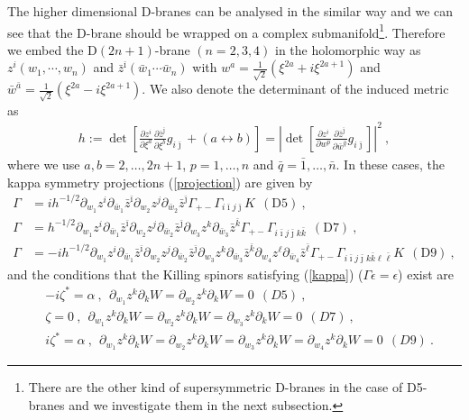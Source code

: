 \documentclass[a4paper,12pt]{article}
\numberwithin{equation}{section}
\newcommand{\del}{\partial}
\newcommand{\ib}{\bar{\imath}}
\newcommand{\jb}{\bar{\jmath}}
\newcommand{\kb}{\bar{k}}
\newcommand{\lb}{\bar{\ell}}
\newcommand{\wb}{\bar{w}}
\newcommand{\zb}{\bar{z}}
\newcommand{\nn}{\nonumber\\}
\newcommand{\deldel}[2]{\frac{\del #1}{\del #2}}
\begin{document}
The higher dimensional D-branes can be  analysed in the similar way and
we can see that the D-brane should be wrapped
on a complex submanifold\footnote{There are the other kind of
supersymmetric D-branes in the case of D5-branes and 
we investigate them in the next subsection.}.
Therefore we embed the D$(2n+1)$-brane $(n=2,3,4)$ 
in the holomorphic way as $z^i(w_1, \cdots, w_n)$ and 
$\bar{z}^{\ib} (\bar{w}_1 \cdots \bar{w}_n)$ with 
$w^a=\frac{1}{\sqrt{2}}(\xi^{2a} + i  \xi^{2a+1})$  and
$\bar{w}^{\bar{a}}=\frac{1}{\sqrt{2}}(\xi^{2a} - i \xi^{2a+1})$.
We also denote the determinant of the induced metric as
\begin{align}
  h:=\det \left[\deldel{z^{i}}{\xi^{a}} 
        \deldel{\zb^{\jb}}{\xi^{b}} g_{i \jb}+(a\leftrightarrow b)\right]
    =\left|\det\left[\deldel{z^{i}}{w^{p}} 
        \deldel{\zb^{\jb}}{\wb^{\bar{q}}} g_{i \jb}\right]\right|^2~,
\end{align}
where we use 
 $a,b=2,\dots,2n+1$, $p=1,\dots,n$ and  $\bar{q}=\bar{1},\dots,\bar{n}$.
In these cases, the kappa symmetry projections (\ref{projection}) are
given by  
\begin{align}
 \Gamma&= i h^{-1/2}
  {\del_{w_1}z^{i}\del_{\wb_1}\zb^{\ib}
        \del_{w_2}z^{j}\del_{\wb_2}\zb^{\jb}}%
       \Gamma_{+-}\Gamma_{i \ib j \jb} K ~~(\mbox{D5})~,\nn
 \Gamma&=h^{-1/2}
  {\del_{w_1}z^{i}\del_{\wb_1}\zb^{\ib}
        \del_{w_2}z^{j}\del_{\wb_2}\zb^{\jb}
        \del_{w_3}z^{k}\del_{\wb_3}\zb^{\kb}}%
       \Gamma_{+-}\Gamma_{i \ib j \jb k \kb} 
      ~~(\mbox{D7})~,\nn
 \Gamma&= -i h^{-1/2}
  {\del_{w_1}z^{i}\del_{\wb_1}\zb^{\ib}
        \del_{w_2}z^{j}\del_{\wb_2}\zb^{\jb}
        \del_{w_3}z^{k}\del_{\wb_3}\zb^{\kb}
        \del_{w_4}z^{\ell}\del_{\wb_4}\zb^{\lb}}%
       \Gamma_{+-}\Gamma_{i\ib j\jb k\kb \ell\lb}K
     ~~(\mbox{D9})~,
\end{align}
and the conditions that the Killing spinors satisfying (\ref{kappa})
($\Gamma \epsilon = \epsilon$) exist are
\begin{align}
 &- i\zeta^{*}=\alpha~, 
  ~~ \del_{w_1}z^{k}\del_{k} W=\del_{w_2}z^{k}\del_{k} W=0 ~~(D5)~,\nn
 &\zeta=0~, ~~ \del_{w_1}z^{k}\del_{k} W=
            \del_{w_2}z^{k}\del_{k} W=\del_{w_3}z^{k}\del_{k} W=0~~(D7)~,\nn
 & i\zeta^{*}=\alpha~, 
  ~~ \del_{w_1}z^{k}\del_{k} W=\del_{w_2}z^{k}\del_{k} W=
             \del_{w_3}z^{k}\del_{k}W=\del_{w_4}z^{k}\del_{k} W=0 ~~(D9)~.
\label{Dpcond}
\end{align}
\end{document}
